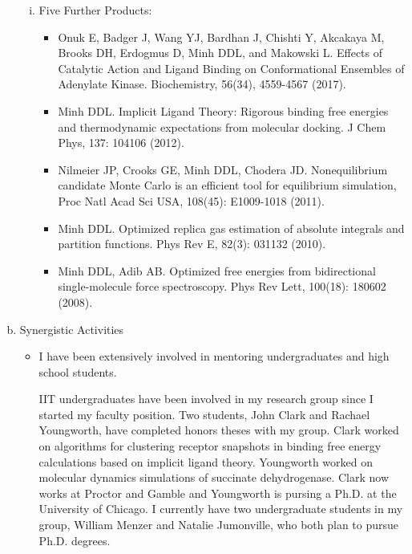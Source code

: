 \begin{enumerate}[(a)]
\begin{enumerate}[(i)]
\item Five Further Products:
\begin{itemize}
\item Onuk E, Badger J, Wang YJ, Bardhan J, Chishti Y, Akcakaya M, Brooks DH, Erdogmus D, Minh DDL, and Makowski L. Effects of Catalytic Action and Ligand Binding on Conformational Ensembles of Adenylate Kinase. Biochemistry, 56(34), 4559-4567 (2017).
\item Minh DDL. Implicit Ligand Theory: Rigorous binding free energies and thermodynamic expectations from molecular docking.  J Chem Phys, 137: 104106 (2012). %
\item Nilmeier JP, Crooks GE, Minh DDL, Chodera JD. Nonequilibrium candidate Monte Carlo is an efficient tool for equilibrium simulation, Proc Natl Acad Sci USA, 108(45): E1009-1018 (2011).%
\item Minh DDL.  Optimized replica gas estimation of absolute integrals and partition functions.  Phys Rev E, 82(3): 031132 (2010). %
\item Minh DDL, Adib AB.  Optimized free energies from bidirectional single-molecule force spectroscopy.  Phys Rev Lett, 100(18): 180602 (2008). %
\end{itemize}
\end{enumerate}

\clearpage

\item Synergistic Activities
\begin{itemize}
\item I have been extensively involved in mentoring undergraduates and high school students.

IIT undergraduates have been involved in my research group since I started my faculty position. Two students, John Clark and Rachael Youngworth, have completed honors theses with my group. Clark worked on algorithms for clustering receptor snapshots in binding free energy calculations based on implicit ligand theory. Youngworth worked on molecular dynamics simulations of succinate dehydrogenase. Clark now works at Proctor and Gamble and Youngworth is pursing a Ph.D. at the University of Chicago. I currently have two undergraduate students in my group, William Menzer and Natalie Jumonville, who both plan to pursue Ph.D. degrees.


\end{itemize}
\end{enumerate}
